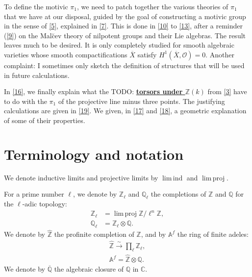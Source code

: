 \documentclass{article}
\theoremstyle{definition}
\newenvironment{env}[1]
    {\renewcommand\theinnercustomenv{(#1)}\innercustomenv}
    {\endinnercustomenv}
\newcommand{\sh}{\mathscr}
\newcommand{\bb}{\mathbb}
\newcommand{\ZZ}{\bb{Z}}
\newcommand{\hZZ}{\widehat{\bb{Z}}}
\renewcommand{\AA}{\bb{A}}
\newcommand{\CC}{\bb{C}}
\newcommand{\QQ}{\bb{Q}}
\newcommand{\cQQ}{\overline{\QQ}}
\DeclareMathOperator{\limind}{lim\,ind}
\DeclareMathOperator{\limproj}{lim\,proj}
\newcommand{\unsure}[1]{TODO: \underline{\textbf{#1}}}
\newcommand{\oldpage}[1]{\marginpar{\footnotesize$\Big\vert$ \textit{p.~#1}}}
\begin{document}
To define the motivic $\pi_1$, we need to patch together the various theories of $\pi_1$ that we have at our disposal, guided by the goal of constructing a motivic group in the sense of \cref{5}, explained in \cref{7}.
This is done in \cref{10} to \cref{13}, after a reminder (\cref{9}) on the Mal\u{c}ev theory of nilpotent groups and their Lie algebras.
The result leaves much to be desired.
It is only completely studied for smooth algebraic varieties whose smooth compactifications $\overline{X}$ satisfy $H^1(\overline{X},\sh{O})=0$.
Another complaint: I sometimes only sketch the definition of structures that will be used in future calculations.

In \cref{16}, we finally explain what the \unsure{torsors under $\ZZ(k)$} from \cref{3} have to do with the $\pi_1$ of the projective line minus three points.
The justifying calculations are given in \cref{19}.
We given, in \cref{17} and \cref{18}, a geometric explanation of some of their properties.

\oldpage{87}
\section{Terminology and notation}
\label{0}

\begin{env}{0.1}
\label{0.1}
  We denote inductive limits and projective limits by $\limind$ and $\limproj$.
\end{env}

\begin{env}{0.2}
\label{0.2}
  For a prime number $\ell$, we denote by $\ZZ_\ell$ and $\QQ_\ell$ the completions of $\ZZ$ and $\QQ$ for the $\ell$-adic topology:
  \[
    \begin{aligned}
      \ZZ_\ell &= \limproj \ZZ/\ell^n\ZZ,
    \\\QQ_\ell &= \ZZ_\ell\otimes\QQ.
    \end{aligned}
  \]
  We denote by $\hZZ$ the profinite completion of $\ZZ$, and by $\AA^f$ the ring of finite adeles:
  \[
    \begin{gathered}
      \hZZ \xrightarrow{\sim} \prod_\ell \ZZ_\ell,
    \\\AA^f = \hZZ\otimes\QQ.
    \end{gathered}
  \]
  We denote by $\cQQ$ the algebraic closure of $\QQ$ in $\CC$.
\end{env}



\nocite{*}
\end{document}
